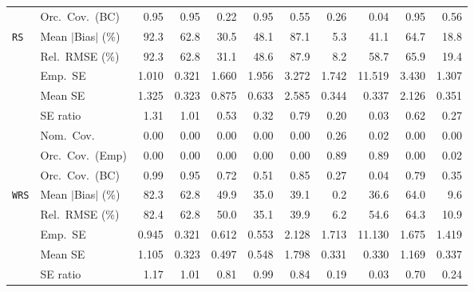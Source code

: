 \begin{landscape}
\begin{longtable}{llrrrrrrrrr}
 & Orc.\ Cov.\ (BC) & \cellcolor{rankone}0.95 & \cellcolor{rankone}0.95 & 0.22 & \cellcolor{rankone}0.95 & \cellcolor{rankthree}0.55 & 0.26 & 0.04 & \cellcolor{rankone}0.95 & \cellcolor{ranktwo}0.56 \\
\addlinespace[2pt]
\quad \texttt{RS} & Mean $|$Bias$|$ (\%) & 92.3 & 62.8 & \cellcolor{rankthree}30.5 & 48.1 & 87.1 & \cellcolor{rankone}5.3 & 41.1 & 64.7 & \cellcolor{ranktwo}18.8 \\
 & Rel.\ RMSE (\%) & 92.3 & 62.8 & \cellcolor{rankthree}31.1 & 48.6 & 87.9 & \cellcolor{rankone}8.2 & 58.7 & 65.9 & \cellcolor{ranktwo}19.4 \\
 & Emp.\ SE & 1.010 & 0.321 & 1.660 & 1.956 & 3.272 & 1.742 & 11.519 & 3.430 & 1.307 \\
 & Mean SE & 1.325 & 0.323 & 0.875 & 0.633 & 2.585 & 0.344 & 0.337 & 2.126 & 0.351 \\
 & SE ratio & \cellcolor{rankthree}1.31 & \cellcolor{rankone}1.01 & 0.53 & 0.32 & \cellcolor{ranktwo}0.79 & 0.20 & 0.03 & 0.62 & 0.27 \\
 & Nom.\ Cov. & \cellcolor{rankthree}0.00 & \cellcolor{rankthree}0.00 & \cellcolor{rankthree}0.00 & \cellcolor{rankthree}0.00 & \cellcolor{rankthree}0.00 & \cellcolor{rankone}0.26 & \cellcolor{ranktwo}0.02 & \cellcolor{rankthree}0.00 & \cellcolor{rankthree}0.00 \\
 & Orc.\ Cov.\ (Emp) & \cellcolor{rankthree}0.00 & \cellcolor{rankthree}0.00 & \cellcolor{rankthree}0.00 & \cellcolor{rankthree}0.00 & \cellcolor{rankthree}0.00 & \cellcolor{rankone}0.89 & \cellcolor{rankone}0.89 & \cellcolor{rankthree}0.00 & \cellcolor{ranktwo}0.02 \\
 & Orc.\ Cov.\ (BC) & \cellcolor{ranktwo}0.99 & \cellcolor{rankone}0.95 & 0.72 & 0.51 & \cellcolor{rankthree}0.85 & 0.27 & 0.04 & 0.79 & 0.35 \\
\addlinespace[2pt]
\quad \texttt{WRS} & Mean $|$Bias$|$ (\%) & 82.3 & 62.8 & 49.9 & \cellcolor{rankthree}35.0 & 39.1 & \cellcolor{rankone}0.2 & 36.6 & 64.0 & \cellcolor{ranktwo}9.6 \\
 & Rel.\ RMSE (\%) & 82.4 & 62.8 & 50.0 & \cellcolor{rankthree}35.1 & 39.9 & \cellcolor{rankone}6.2 & 54.6 & 64.3 & \cellcolor{ranktwo}10.9 \\
 & Emp.\ SE & 0.945 & 0.321 & 0.612 & 0.553 & 2.128 & 1.713 & 11.130 & 1.675 & 1.419 \\
 & Mean SE & 1.105 & 0.323 & 0.497 & 0.548 & 1.798 & 0.331 & 0.330 & 1.169 & 0.337 \\
 & SE ratio & \cellcolor{rankthree}1.17 & \cellcolor{rankone}1.01 & 0.81 & \cellcolor{rankone}0.99 & \cellcolor{ranktwo}0.84 & 0.19 & 0.03 & 0.70 & 0.24 \\

\end{longtable}
\end{landscape}
